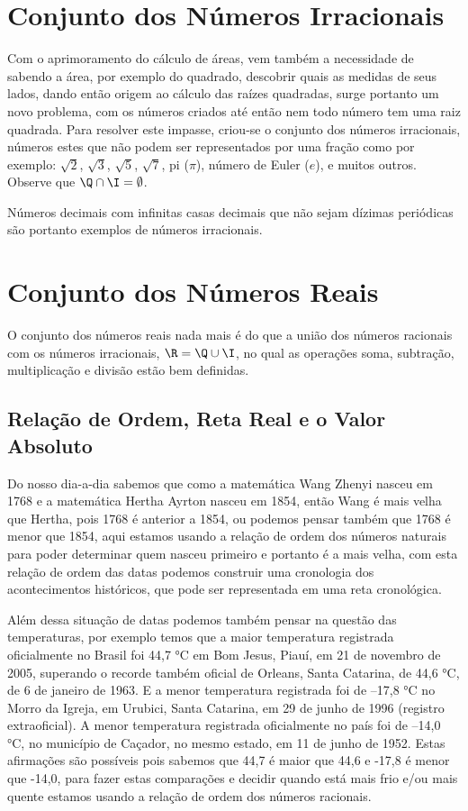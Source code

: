 \section{Conjunto dos Números Irracionais}

Com o aprimoramento do cálculo de áreas, vem também a necessidade de sabendo a área, por exemplo do quadrado, descobrir quais as medidas de seus lados, dando então origem ao cálculo das raízes quadradas, surge portanto um novo problema, com os números criados até então nem todo número tem uma raiz quadrada. Para resolver este impasse, criou-se o conjunto dos números irracionais, números estes que não podem ser representados por uma fração como por exemplo: $\sqrt{2}$, $\sqrt{3}$, $\sqrt{5}$, $\sqrt{7}$, pi ($\pi$), número de Euler ($e$), e muitos outros. Observe que $\Q \cap \I = \emptyset$.

Números decimais com infinitas casas decimais que não sejam dízimas periódicas são portanto exemplos de números irracionais.

\section{Conjunto dos Números Reais}

O conjunto dos números reais nada mais é do que a união dos números racionais com os números irracionais, $\R= \Q \cup \I$, no qual as operações soma, subtração, multiplicação e divisão estão bem definidas.

\subsection{Relação de Ordem, Reta Real e o Valor Absoluto}

Do nosso dia-a-dia sabemos que como a matemática Wang Zhenyi nasceu em 1768 e a matemática Hertha Ayrton nasceu em 1854, então Wang é mais velha que Hertha, pois 1768 é anterior a 1854, ou podemos pensar também que 1768 é  menor que 1854, aqui estamos usando a relação de ordem dos números naturais para poder determinar quem nasceu primeiro e portanto é a mais velha, com esta relação de ordem das datas podemos construir uma cronologia dos acontecimentos históricos, que pode ser representada em uma reta cronológica.

Além dessa situação de datas podemos também pensar na questão das temperaturas, por exemplo temos que a maior temperatura registrada oficialmente no Brasil foi 44,7 °C em Bom Jesus, Piauí, em 21 de novembro de 2005, superando o recorde também oficial de Orleans, Santa Catarina, de 44,6 °C, de 6 de janeiro de 1963. E a menor temperatura registrada foi de –17,8 °C no Morro da Igreja, em Urubici, Santa Catarina, em 29 de junho de 1996 (registro extraoficial). A menor temperatura registrada oficialmente no país foi de –14,0 °C, no município de Caçador, no mesmo estado, em 11 de junho de 1952. Estas afirmações são possíveis pois sabemos que 44,7 é maior que 44,6 e -17,8 é menor que -14,0, para fazer estas comparações e decidir quando está mais frio e/ou mais quente estamos usando a relação de ordem dos números racionais.

